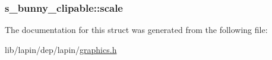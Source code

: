 \hypertarget{structs__bunny__clipable_a05f2d5e80b1a6e07ad23b797dc73ac37}{
\subsubsection[{scale}]{ s\-\_\-bunny\-\_\-clipable\-::scale}}\label{structs__bunny__clipable_a05f2d5e80b1a6e07ad23b797dc73ac37}


The documentation for this struct was generated from the following file\-:\begin{DoxyCompactItemize}
\item 
lib/lapin/dep/lapin/\hyperlink{graphics_8h}{graphics.\-h}\end{DoxyCompactItemize}
